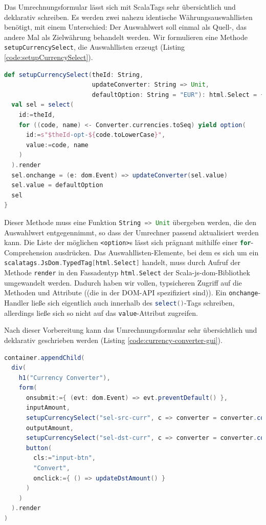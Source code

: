 \documentclass[a4paper, 12pt, hidelinks, listof=totoc, listoftables=totoc, bibliography=totoc]{scrreprt}
\newcommand{\scala}[1]{\lstinline[language=Scala, style=inline]|#1|}
\newcommand{\html}[1]{\lstinline[language=HTML5, style=inline]|#1|}
\begin{document}
Das Umrechnungsformular lässt sich mit ScalaTags sehr übersichtlich und deklarativ schreiben. Es werden zwei nahezu identische Währungsauswahllisten benötigt, mit einem Unterschied: Der Auswahlwert soll einmal als Quell-, das andere Mal als Zielwährung behandelt werden. Wir formulieren eine Methode \scala{setupCurrencySelect}, die Auswahllisten erzeugt (Listing \ref{code:setupCurrencySelect}).

\begin{lstlisting}[language=Scala, caption={Methode zur Erzeugung eines \html{<select>}-Elements.}, label={code:setupCurrencySelect}]
def setupCurrencySelect(theId: String,
                        updateConverter: String => Unit,
                        defaultOption: String = "EUR"): html.Select = {
  val sel = select(
    id:=theId,
    for ((code, name) <- Converter.currencies.toSeq) yield option(
      id:=s"$theId-opt-${code.toLowerCase}",
      value:=code, name
    )
  ).render
  sel.onchange = (e: dom.Event) => updateConverter(sel.value)
  sel.value = defaultOption
  sel
}
\end{lstlisting}

Dieser Methode muss eine Funktion \scala{String => Unit} übergeben werden, die den Auswahlwert entgegennimmt, so dass der Umrechner passend aktualisiert werden kann. Die Liste der möglichen \html{<option>}s lässt sich prägnant mithilfe einer \scala{for}-Comprehension ausdrücken. Das Auswahllisten-Elemente, bei dem es sich um ein \scala{scalatags.JsDom.TypedTag[html.Select]} handelt, muss durch Aufruf der Methode \scala{render} in den Fassadentyp \scala{html.Select} der Scala-js-dom-Bibliothek umgewandelt werden. Dadurch haben wir vollen, typsicheren Zugriff auf die Methoden und Attribute ((die in der DOM-API spezifiziert sind)). Ein \scala{onchange}-Handler ließe sich eigentlich auch innerhalb des \scala{select()}-Tags schreiben, allerdings ließe sich so nicht auf das \scala{value}-Attribut zugreifen.

Nach dieser Vorbereitung kann das Umrechnungsformular sehr übersichtlich und deklarativ geschrieben werden (Listing \ref{code:currency-converter-gui}).

\begin{lstlisting}[language=Scala, caption={Deklaration eines Formulars zur Währungsumrechnung mit ScalaTags.}, label={code:currency-converter-gui}]
container.appendChild(
  div(
    h1("Currency Converter"),
    form(
      onsubmit:={ (evt: dom.Event) => evt.preventDefault() },
      inputAmount,
      setupCurrencySelect("sel-src-curr", c => converter = converter.copy(srcCurr = c)),
      outputAmount,
      setupCurrencySelect("sel-dst-curr", c => converter = converter.copy(dstCurr = c)),
      button(
        cls:="input-btn",
        "Convert",
        onclick:={ () => updateDstAmount() }
      )
    )
  ).render
)
\end{lstlisting}
\end{document}
